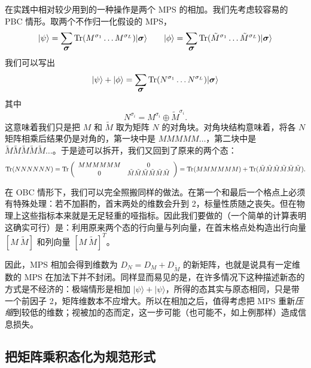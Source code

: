 \documentclass[a4paper,10pt,oneside,onecolumn,1p,times]{elsarticle}
\newcommand{\tr}{{\rm Tr }}
\newcommand{\ket}[1]{\mbox{$| #1  \rangle$}}
\newcommand{\fat}[1]{\mbox{\boldmath$#1$\unboldmath}}	%
\begin{document}
在实践中相对较少用到的一种操作是两个 MPS 的相加。我们先考虑较容易的 PBC 情形。取两个不作归一化假设的 MPS，
\begin{equation}
\ket{\psi} = \sum_{\fat{\sigma}} \tr (M^{\sigma_1} \ldots M^{\sigma_L}) \ket{\fat{\sigma}} 
\quad\quad
\ket{\phi} = \sum_{\fat{\sigma}} \tr (\tilde{M}^{\sigma_1} \ldots \tilde{M}^{\sigma_L}) \ket{\fat{\sigma}} 
\end{equation}
我们可以写出
\begin{equation}
\ket{\psi} + \ket{\phi} = \sum_{\fat{\sigma}} \tr (N^{\sigma_1} \ldots N^{\sigma_L}) \ket{\fat{\sigma}}
\end{equation}
其中
\begin{equation}
N^{\sigma_i} =  M^{\sigma_i} \oplus \tilde{M}^{\sigma_i} .
\end{equation} 
这意味着我们只是把 $M$ 和 $\tilde{M}$ 取为矩阵 $N$ 的对角块。对角块结构意味着，将各 $N$ 矩阵相乘后结果仍是对角的，第一块中是 $MMMMM\ldots$，第二块中是 $\tilde{M}\tilde{M}\tilde{M}\tilde{M}\tilde{M}\ldots$。于是迹可以拆开，我们又回到了原来的两个态：
\begin{equation}
\tr (NNNNNN) = \tr \left( \begin{array}{cc} MMMMMM & 0 \\ 0 & \tilde{M}\tilde{M}\tilde{M}\tilde{M}\tilde{M}\tilde{M} \end{array} \right) = \tr (MMMMMM) + \tr (\tilde{M}\tilde{M}\tilde{M}\tilde{M}\tilde{M}\tilde{M}).
\end{equation} 

在 OBC 情形下，我们可以完全照搬同样的做法。在第一个和最后一个格点上必须有特殊处理：若不加斟酌，首末两处的维数会升到 2，标量性质随之丧失。但在物理上这些指标本来就是无足轻重的哑指标。因此我们要做的（一个简单的计算表明这确实可行）是：利用原来两个态的行向量与列向量，在首末格点处构造出行向量 $[ M\ \tilde{M}]$ 和列向量 $[M\ \tilde{M}]^T$。

因此，MPS 相加会得到维数为 $D_N = D_M + D_{\tilde{M}}$ 的新矩阵，也就是说具有一定维数的 MPS 在加法下并不封闭。同样显而易见的是，在许多情况下这种描述新态的方式是不经济的：极端情形是相加 $\ket{\psi}+\ket{\psi}$，所得的态其实与原态相同，只是带一个前因子 2，矩阵维数本不应增大。所以在相加之后，值得考虑把 MPS 重新{\em 压缩}到较低的维数；视被加的态而定，这一步可能（也可能不，如上例那样）造成信息损失。

\subsection{把矩阵乘积态化为规范形式}
\end{document}
